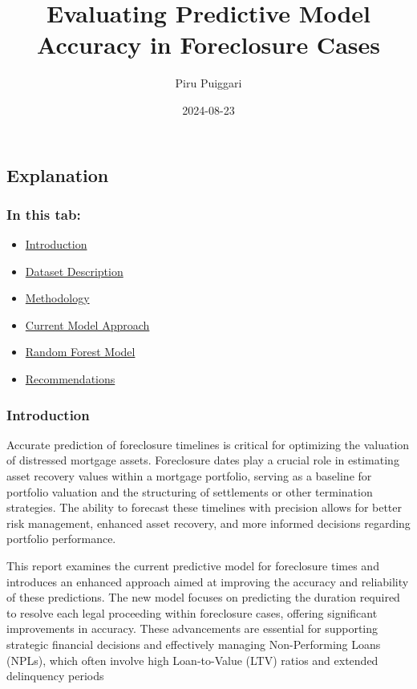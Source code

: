 \documentclass[
  letterpaper,
  DIV=11,
  numbers=noendperiod]{scrartcl}
\title{Evaluating Predictive Model Accuracy in Foreclosure Cases}
\author{Piru Puiggari}
\date{2024-08-23}
\providecommand{\tightlist}{%
  \setlength{\itemsep}{0pt}\setlength{\parskip}{0pt}}\usepackage{longtable,booktabs,array}
\begin{document}
\maketitle


\subsection{Explanation}

\subsubsection{In this tab:}\label{in-this-tab}

\begin{itemize}
\tightlist
\item
  \hyperref[sec-introduction]{Introduction}
\item
  \hyperref[sec-dataset]{Dataset Description}
\item
  \hyperref[sec-methodology]{Methodology}
\item
  \hyperref[sec-current-model]{Current Model Approach}
\item
  \hyperref[sec-random-forest]{Random Forest Model}
\item
  \hyperref[sec-recommendations]{Recommendations}
\end{itemize}

\subsubsection{Introduction}\label{sec-introduction}

Accurate prediction of foreclosure timelines is critical for optimizing
the valuation of distressed mortgage assets. Foreclosure dates play a
crucial role in estimating asset recovery values within a mortgage
portfolio, serving as a baseline for portfolio valuation and the
structuring of settlements or other termination strategies. The ability
to forecast these timelines with precision allows for better risk
management, enhanced asset recovery, and more informed decisions
regarding portfolio performance.

This report examines the current predictive model for foreclosure times
and introduces an enhanced approach aimed at improving the accuracy and
reliability of these predictions. The new model focuses on predicting
the duration required to resolve each legal proceeding within
foreclosure cases, offering significant improvements in accuracy. These
advancements are essential for supporting strategic financial decisions
and effectively managing Non-Performing Loans (NPLs), which often
involve high Loan-to-Value (LTV) ratios and extended delinquency periods
\end{document}
